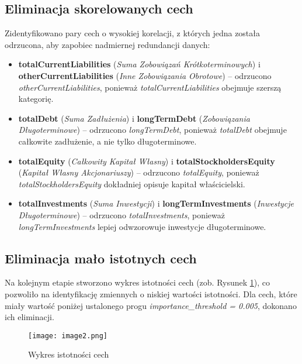 \documentclass[12pt]{article}
\begin{document}
\subsection{Eliminacja skorelowanych cech}

Zidentyfikowano pary cech o wysokiej korelacji, z których jedna została odrzucona, aby zapobiec nadmiernej redundancji danych:
\begin{itemize}
    \item \textbf{totalCurrentLiabilities} (\emph{Suma Zobowiązań Krótkoterminowych}) i \textbf{otherCurrentLiabilities} (\emph{Inne Zobowiązania Obrotowe}) – odrzucono \emph{otherCurrentLiabilities}, ponieważ \emph{totalCurrentLiabilities} obejmuje szerszą kategorię.
    \item \textbf{totalDebt} (\emph{Suma Zadłużenia}) i \textbf{longTermDebt} (\emph{Zobowiązania Długoterminowe}) – odrzucono \emph{longTermDebt}, ponieważ \emph{totalDebt} obejmuje całkowite zadłużenie, a nie tylko długoterminowe.
    \item \textbf{totalEquity} (\emph{Całkowity Kapitał Własny}) i \textbf{totalStockholdersEquity} (\emph{Kapitał Własny Akcjonariuszy}) – odrzucono \emph{totalEquity}, ponieważ \emph{totalStockholdersEquity} dokładniej opisuje kapitał właścicielski.
    \item \textbf{totalInvestments} (\emph{Suma Inwestycji}) i \textbf{longTermInvestments} (\emph{Inwestycje Długoterminowe}) – odrzucono \emph{totalInvestments}, ponieważ \emph{longTermInvestments} lepiej odwzorowuje inwestycje długoterminowe.
\end{itemize}

\subsection{Eliminacja mało istotnych cech}

Na kolejnym etapie stworzono wykres istotności cech (zob. Rysunek \ref{fig:feature_importance}), co pozwoliło na identyfikację zmiennych o niskiej wartości istotności. Dla cech, które miały wartość poniżej ustalonego progu \emph{importance\_threshold = 0.005}, dokonano ich eliminacji.

\begin{figure}[h]
    \centering
    \texttt{[image: image2.png]}
    \caption{Wykres istotności cech}
    \label{fig:feature_importance}
\end{figure}
\end{document}
